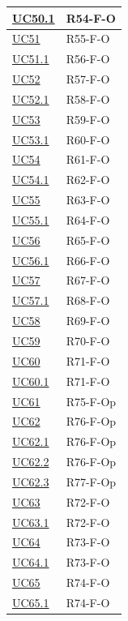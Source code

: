 \begin{longtable}{|p{2.8cm}|p{10.2cm}|}
	\hyperlink{uc50.1}{UC50.1} & R54-F-O \\ \hline
	\hyperlink{uc51}{UC51}   & R55-F-O \\ \hline
	\hyperlink{uc51.1}{UC51.1} & R56-F-O \\ \hline
	\hyperlink{uc52}{UC52}   & R57-F-O \\ \hline
	\hyperlink{uc52.1}{UC52.1} & R58-F-O \\ \hline
	\hyperlink{uc53}{UC53}   & R59-F-O \\ \hline
	\hyperlink{uc53.1}{UC53.1} & R60-F-O \\ \hline
	\hyperlink{uc54}{UC54}   & R61-F-O \\ \hline
	\hyperlink{uc54.1}{UC54.1} & R62-F-O \\ \hline
	\hyperlink{uc55}{UC55}   & R63-F-O \\ \hline
	\hyperlink{uc55.1}{UC55.1} & R64-F-O \\ \hline
	\hyperlink{uc56}{UC56}   & R65-F-O \\ \hline
	\hyperlink{uc56.1}{UC56.1} & R66-F-O \\ \hline
	\hyperlink{uc57}{UC57}   & R67-F-O \\ \hline
	\hyperlink{uc57.1}{UC57.1} & R68-F-O \\ \hline
	\hyperlink{uc58}{UC58}   & R69-F-O \\ \hline
	\hyperlink{uc59}{UC59}   & R70-F-O \\ \hline
	\hyperlink{uc60}{UC60}   & R71-F-O \\ \hline
	\hyperlink{uc60.1}{UC60.1} & R71-F-O \\ \hline
	\hyperlink{uc61}{UC61}     & R75-F-Op \\ \hline
	\hyperlink{uc62}{UC62}     & R76-F-Op \\ \hline
	\hyperlink{uc62.1}{UC62.1} & R76-F-Op \\ \hline
	\hyperlink{uc62.2}{UC62.2} & R76-F-Op \\ \hline
	\hyperlink{uc62.3}{UC62.3} & R77-F-Op \\ \hline
	\hyperlink{uc63}{UC63}   & R72-F-O \\ \hline
	\hyperlink{uc63.1}{UC63.1} & R72-F-O \\ \hline
	\hyperlink{uc64}{UC64}   & R73-F-O \\ \hline
	\hyperlink{uc64.1}{UC64.1} & R73-F-O \\ \hline
	\hyperlink{uc65}{UC65}   & R74-F-O \\ \hline
	\hyperlink{uc65.1}{UC65.1} & R74-F-O \\ \hline

\end{longtable}
